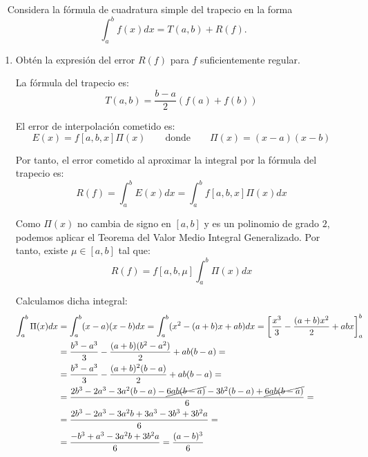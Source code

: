 \begin{ejercicio}~\label{ej:2.3.3}
    Considera la fórmula de cuadratura simple del trapecio en la forma
    \begin{equation*}
        \int_{a}^{b} f(x) dx = T(a, b) + R(f).
    \end{equation*}
    \begin{enumerate}
        \item Obtén la expresión del error $R(f)$ para $f$ suficientemente regular.
        
        La fórmula del trapecio es:
        \begin{equation*}
            T(a, b) = \dfrac{b-a}{2}\left(f(a) + f(b)\right)
        \end{equation*}

        El error de interpolación cometido es:
        \begin{equation*}
            E(x) = f[a,b,x]\Pi(x)\qquad \text{donde}\qquad \Pi(x) = (x-a)(x-b)
        \end{equation*}

        Por tanto, el error cometido al aproximar la integral por la fórmula del trapecio es:
        \begin{equation*}
            R(f) = \int_{a}^{b} E(x)dx = \int_{a}^{b} f[a,b,x]\Pi(x)dx
        \end{equation*}

        Como $\Pi(x)$ no cambia de signo en $[a,b]$ y es un polinomio de grado $2$, podemos aplicar el Teorema del Valor Medio Integral Generalizado. Por tanto, existe $\mu\in [a,b]$ tal que:
        \begin{equation*}
            R(f) = f[a,b,\mu]\int_{a}^{b} \Pi(x)dx
        \end{equation*}

        Calculamos dicha integral:
        \begin{align*}
            \int_{a}^{b} \Pi(x)dx &= \int_{a}^{b} (x-a)(x-b)dx = \int_{a}^{b} (x^2 - (a+b)x + ab)dx
            = \left[\dfrac{x^3}{3} - \dfrac{(a+b)x^2}{2} + abx\right]_{a}^{b}\\
            &= \dfrac{b^3-a^3}{3} - \dfrac{(a+b)(b^2-a^2)}{2} + ab(b-a)
            =\\&= \dfrac{b^3-a^3}{3} - \dfrac{(a+b)^2(b-a)}{2} + ab(b-a)
            =\\&= \dfrac{2b^3-2a^3-3a^2(b-a)-\cancel{6ab(b-a)}-3b^2(b-a)+\cancel{6ab(b-a)}}{6}
            =\\&= \dfrac{2b^3-2a^3-3a^2b+3a^3-3b^3+3b^2a}{6}
            =\\&= \dfrac{-b^3+a^3-3a^2b+3b^2a}{6} = \dfrac{(a-b)^3}{6}
        \end{align*}


\end{enumerate}
\end{ejercicio}
